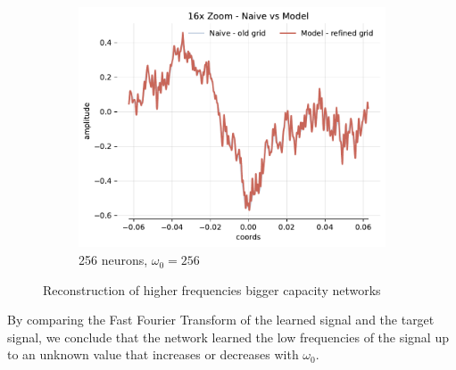\begin{figure}[h]
\begin{subfigure}[b]{0.32\textwidth}
        \centering
        \includegraphics[width=\textwidth]{img/ch3/16x-zoom-1hl-256hf-256hz.pdf}
        \caption{256 neurons, $\omega_0=256$}
        \label{fig:16x-zoom-1hl-256hf-256hz}
    \end{subfigure}
    \caption{Reconstruction of higher frequencies bigger capacity networks}
    \label{f:comparison-64-to-256-hf}
\end{figure}


By comparing the Fast Fourier Transform of the learned signal and the target signal, we conclude that the network learned the low frequencies of the signal up to an unknown value that increases or decreases with $\omega_0$.





